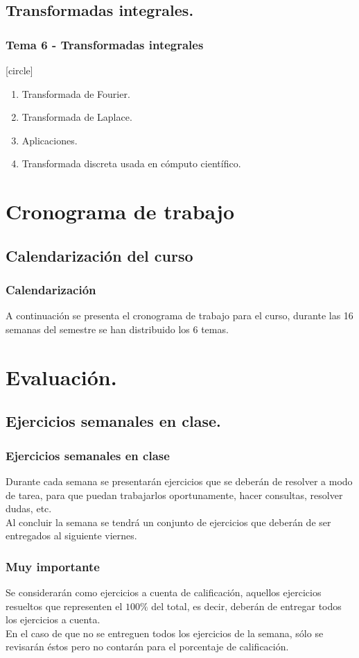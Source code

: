 \subsection{Transformadas integrales.}
\begin{frame}
\frametitle{Tema 6 - Transformadas integrales}
[circle]
\begin{enumerate}[<+->]
\item Transformada de Fourier.
\item Transformada de Laplace.
\item Aplicaciones.
\item Transformada discreta usada en cómputo científico.
\end{enumerate}
\end{frame}
\section{Cronograma de trabajo}
\subsection{Calendarización del curso}
\begin{frame}
\frametitle{Calendarización}
A continuación se presenta el cronograma de trabajo para el curso, durante las 16 semanas del semestre se han distribuido los 6 temas.
\end{frame}
{

}
\section{Evaluación.}
\subsection{Ejercicios semanales en clase.}
\begin{frame}
\frametitle{Ejercicios semanales en clase}
Durante cada semana se presentarán ejercicios que se deberán de resolver a modo de tarea, para que puedan trabajarlos oportunamente, hacer consultas, resolver dudas, etc.
\\
\bigskip
\pause
Al concluir la semana se tendrá un conjunto de ejercicios que deberán de ser entregados al siguiente viernes.
\end{frame}
\begin{frame}
\frametitle{Muy importante}
Se considerarán como ejercicios a cuenta de calificación, aquellos ejercicios resueltos que representen el $100\%$ del total, es decir, deberán de entregar todos los ejercicios a cuenta.
\\
\bigskip
\pause
En el caso de que no se entreguen todos los ejercicios de la semana, sólo se revisarán éstos pero no contarán para el porcentaje de calificación.
\end{frame}
